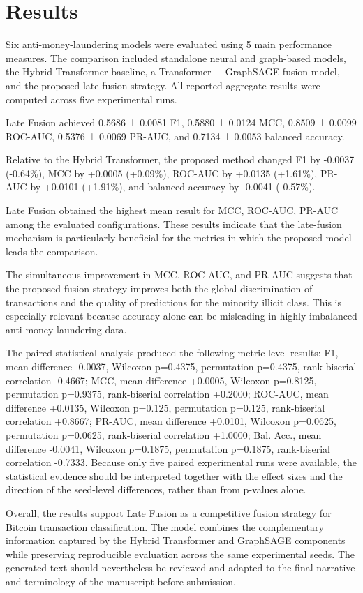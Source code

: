 \section{Results}

Six anti-money-laundering models were evaluated using 5 main performance measures. The comparison included standalone neural and graph-based models, the Hybrid Transformer baseline, a Transformer + GraphSAGE fusion model, and the proposed late-fusion strategy. All reported aggregate results were computed across five experimental runs.

Late Fusion achieved 0.5686 ± 0.0081 F1, 0.5880 ± 0.0124 MCC, 0.8509 ± 0.0099 ROC-AUC, 0.5376 ± 0.0069 PR-AUC, and 0.7134 ± 0.0053 balanced accuracy.

Relative to the Hybrid Transformer, the proposed method changed F1 by -0.0037 (-0.64\%), MCC by +0.0005 (+0.09\%), ROC-AUC by +0.0135 (+1.61\%), PR-AUC by +0.0101 (+1.91\%), and balanced accuracy by -0.0041 (-0.57\%).

Late Fusion obtained the highest mean result for MCC, ROC-AUC, PR-AUC among the evaluated configurations. These results indicate that the late-fusion mechanism is particularly beneficial for the metrics in which the proposed model leads the comparison.

The simultaneous improvement in MCC, ROC-AUC, and PR-AUC suggests that the proposed fusion strategy improves both the global discrimination of transactions and the quality of predictions for the minority illicit class. This is especially relevant because accuracy alone can be misleading in highly imbalanced anti-money-laundering data.

The paired statistical analysis produced the following metric-level results: F1, mean difference -0.0037, Wilcoxon p=0.4375, permutation p=0.4375, rank-biserial correlation -0.4667; MCC, mean difference +0.0005, Wilcoxon p=0.8125, permutation p=0.9375, rank-biserial correlation +0.2000; ROC-AUC, mean difference +0.0135, Wilcoxon p=0.125, permutation p=0.125, rank-biserial correlation +0.8667; PR-AUC, mean difference +0.0101, Wilcoxon p=0.0625, permutation p=0.0625, rank-biserial correlation +1.0000; Bal. Acc., mean difference -0.0041, Wilcoxon p=0.1875, permutation p=0.1875, rank-biserial correlation -0.7333. Because only five paired experimental runs were available, the statistical evidence should be interpreted together with the effect sizes and the direction of the seed-level differences, rather than from p-values alone.

Overall, the results support Late Fusion as a competitive fusion strategy for Bitcoin transaction classification. The model combines the complementary information captured by the Hybrid Transformer and GraphSAGE components while preserving reproducible evaluation across the same experimental seeds. The generated text should nevertheless be reviewed and adapted to the final narrative and terminology of the manuscript before submission.
